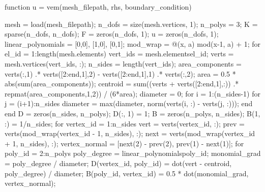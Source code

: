 \documentclass[../main.tex]{subfiles}
\begin{document}
function u = vem(mesh_filepath, rhs, boundary_condition)
%
%
% 
% 


mesh = load(mesh_filepath); %
n_dofs = size(mesh.vertices, 1); n_polys = 3; %
K = sparse(n_dofs, n_dofs); %
F = zeros(n_dofs, 1); %
u = zeros(n_dofs, 1); %
linear_polynomials = {[0,0], [1,0], [0,1]}; %
mod_wrap = @(x, a) mod(x-1, a) + 1; %
for el_id = 1:length(mesh.elements)
	vert_ids = mesh.elements{el_id}; %
	verts = mesh.vertices(vert_ids, :); %
	n_sides = length(vert_ids); %
	area_components = verts(:,1) .* verts([2:end,1],2) - verts([2:end,1],1) .* verts(:,2);
	area = 0.5 * abs(sum(area_components));
	centroid = sum((verts + verts([2:end,1],:)) .* repmat(area_components,1,2)) / (6*area);
	diameter = 0; %
	for i = 1:(n_sides-1)
		for j = (i+1):n_sides
			diameter = max(diameter, norm(verts(i, :) - verts(j, :)));
		end
	end
	D = zeros(n_sides, n_polys); D(:, 1) = 1;
	B = zeros(n_polys, n_sides); B(1, :) = 1/n_sides;
	for vertex_id = 1:n_sides
		vert = verts(vertex_id, :); %
		prev = verts(mod_wrap(vertex_id - 1, n_sides), :);
		next = verts(mod_wrap(vertex_id + 1, n_sides), :);
		vertex_normal = [next(2) - prev(2), prev(1) - next(1)]; %
		for poly_id = 2:n_polys %
			poly_degree = linear_polynomials{poly_id};
			monomial_grad = poly_degree / diameter; %
			D(vertex_id, poly_id) = dot(vert - centroid, poly_degree) / diameter;
			B(poly_id, vertex_id) = 0.5 * dot(monomial_grad, vertex_normal);
\end{document}
